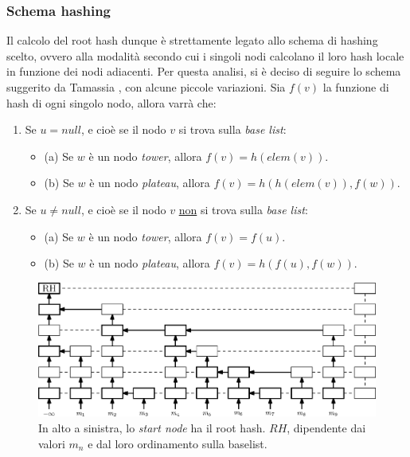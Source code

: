 		\subsubsection{Schema hashing}
	
	
		Il calcolo del root hash dunque è strettamente legato allo schema di hashing scelto, ovvero alla modalità secondo cui i singoli nodi calcolano il loro hash locale in funzione dei nodi adiacenti. Per questa analisi, si è deciso di seguire lo schema suggerito da Tamassia \cite{authskiplist}, con alcune piccole variazioni. 
		Sia $ f(v) $ la funzione di hash di ogni singolo nodo, allora varrà che:
		
		\begin{enumerate}
			\item Se $ u = null $, e cioè se il nodo $ v $ si trova sulla \textit{base list}:
				\begin{itemize}
					\item (a) Se $ w $ è un nodo \textit{tower}, allora $ f(v) = h(elem(v)) $.
					\item (b) Se $ w $ è un nodo \textit{plateau}, allora  $ f(v) = h(h(elem(v)), f(w)) $.
				\end{itemize}
			\item Se $ u \ne null $, e cioè se il nodo $ v $ \underline{non} si trova sulla \textit{base list}:
				\begin{itemize}
					\item (a) Se $ w $ è un nodo \textit{tower}, allora $ f(v) = f(u) $. 
					\item (b) Se $ w $ è un nodo \textit{plateau}, allora  $ f(v) = h(f(u), f(w)) $. 
				\end{itemize}
		\end{enumerate}
	
		\begin{figure}
			\centering
			\includegraphics[scale=0.6]{figure/hashFlow.eps}
			\caption{In alto a sinistra, lo \textit{start node} ha il root hash. $ RH $, dipendente dai valori $ m_{n} $ e dal loro ordinamento sulla baselist.}\label{fig:6}
		\end{figure}
	
